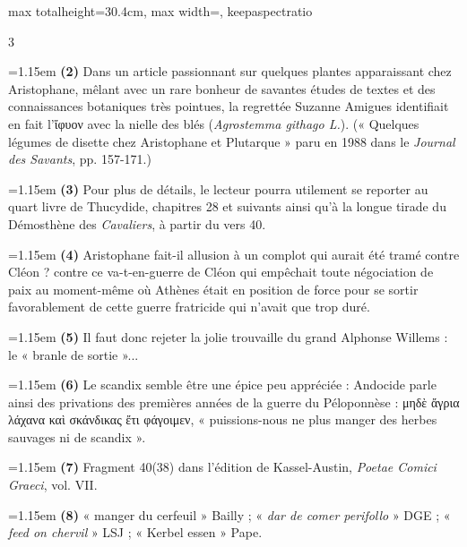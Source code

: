 \documentclass[11pt,twoside]{book}
\newcommand{\italique}[1]{\textit{#1}}
\newcommand{\latin}[1]{\textit{#1}}
\newcommand{\anglais}[1]{\textit{#1}}
\newcommand{\espagnol}[1]{\textit{#1}}
\begin{document}
\begin{adjustbox}{max totalheight=30.4cm, max width=\textwidth, keepaspectratio}
\begin{minipage}{\textwidth}
{\begin{multicols}{3}
\par\vspace{1.5pt}
\noindent\hangindent=1.15em {\color{sepiaNote}\textbf{(2)}} Dans un article passionnant sur quelques plantes apparaissant chez Aristophane, mêlant avec un rare bonheur de savantes études de textes et des connaissances botaniques très pointues, la regrettée Suzanne Amigues identifiait en fait l'ἴφυον avec la nielle des blés (\latin{Agrostemma githago L.}). (« Quelques légumes de disette chez Aristophane et Plutarque » paru en 1988 dans le \italique{Journal des Savants}, pp. 157-171.)
\par\vspace{1.5pt}
\noindent\hangindent=1.15em {\color{sepiaNote}\textbf{(3)}} Pour plus de détails, le lecteur pourra utilement se reporter au quart livre de Thucydide, chapitres 28 et suivants ainsi qu'à la longue tirade du Démosthène des \italique{Cavaliers}, à partir du vers 40.
\par\vspace{1.5pt}
\noindent\hangindent=1.15em {\color{sepiaNote}\textbf{(4)}} Aristophane fait-il allusion à un complot qui aurait été tramé contre Cléon ? contre ce va-t-en-guerre de Cléon qui empêchait toute négociation de paix au moment-même où Athènes était en position de force pour se sortir favorablement de cette guerre fratricide qui n'avait que trop duré.
\par\vspace{1.5pt}
\noindent\hangindent=1.15em {\color{sepiaNote}\textbf{(5)}} Il faut donc rejeter la jolie trouvaille du grand Alphonse Willems : le « branle de sortie »...
\par\vspace{1.5pt}
\noindent\hangindent=1.15em {\color{sepiaNote}\textbf{(6)}} Le scandix semble être une épice peu appréciée : Andocide parle ainsi des privations des premières années de la guerre du Péloponnèse : μηδὲ ἄγρια λάχανα καὶ σκάνδικας ἔτι φάγοιμεν, « puissions-nous ne plus manger des herbes sauvages ni de scandix ».
\par\vspace{1.5pt}
\noindent\hangindent=1.15em {\color{sepiaNote}\textbf{(7)}} Fragment 40(38) dans l'édition de Kassel-Austin, \italique{Poetae Comici Graeci}, vol. VII.
\par\vspace{1.5pt}
\noindent\hangindent=1.15em {\color{sepiaNote}\textbf{(8)}} « manger du cerfeuil » Bailly ; « \espagnol{dar de comer perifollo} » DGE ; « \anglais{feed on chervil} » LSJ ; « Kerbel essen » Pape.

\end{multicols}}
\end{minipage}
\end{adjustbox}
\end{document}
